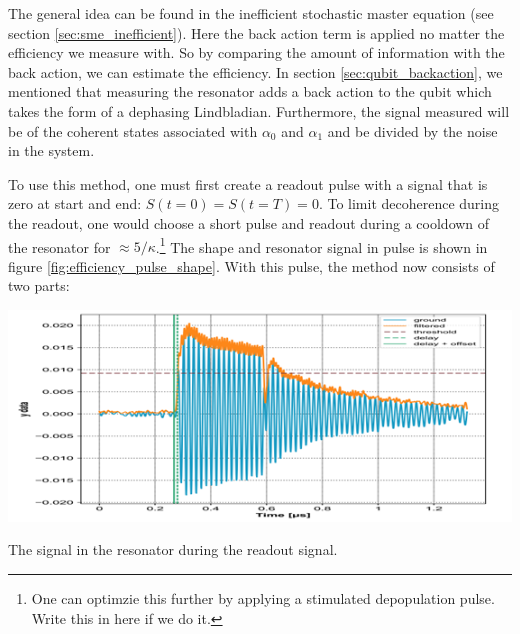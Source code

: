 The general idea can be found in the inefficient stochastic master equation (see section \ref{sec:sme_inefficient}). Here the back action term is applied no matter the efficiency we measure with. So by comparing the amount of information with the back action, we can estimate the efficiency. In section \ref{sec:qubit_backaction}, we mentioned that measuring the resonator adds a back action to the qubit which takes the form of a dephasing Lindbladian. Furthermore, the signal measured will be of the coherent states associated with $\alpha_0$ and $\alpha_1$ and be divided by the noise in the system.

To use this method, one must first create a readout pulse with a signal that is zero at start and end: $S(t = 0) = S(t = T) = 0$. To limit decoherence during the readout, one would choose a short pulse and readout during a cooldown of the resonator for $\approx 5 / \kappa$.\footnote{One can optimzie this further by applying a stimulated depopulation pulse. Write this in here if we do it.} The shape and resonator signal in pulse is shown in figure \ref{fig:efficiency_pulse_shape}.  With this pulse, the method now consists of two parts:


\begin{marginfigure}
    \centering
    \includegraphics{Figs/calibrations/efficiency/pulse_shape.png}
    \caption{The signal in the resonator during the readout signal.}
    \label{fig:efficiency_pulse_shape}
\end{marginfigure}

